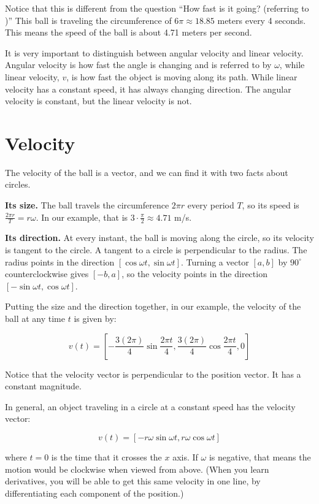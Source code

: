 Notice that this is different from the question ``How fast is it
going? (referring to )''  This ball is traveling the circumference of $6\pi \approx
  18.85$ meters every 4 seconds. This means the speed of the ball is about
4.71 meters per second.

It is very important to distinguish between angular velocity and linear velocity. Angular velocity is how fast the angle is changing and is referred to by $\omega$, while linear velocity, $v$, is how fast the object is moving along its path. While linear velocity has a constant speed, it has always changing direction. The angular velocity is constant, but the linear velocity is not.

\section{Velocity}
The velocity of the ball is a vector, and we can find it with two facts about circles.

\textbf{Its size.} The ball travels the circumference $2\pi r$ every period $T$, so its speed is
$\frac{2\pi r}{T} = r\omega$. In our example, that is $3 \cdot \frac{\pi}{2} \approx 4.71$ m/s.

\textbf{Its direction.} At every instant, the ball is moving along the circle, so its velocity is tangent to the
circle. A tangent to a circle is perpendicular to the radius. The radius points in the direction
$[\cos \omega t, \sin \omega t]$. Turning a vector $[a, b]$ by $90^\circ$ counterclockwise gives $[-b, a]$, so
the velocity points in the direction $[-\sin \omega t, \cos \omega t]$.

Putting the size and the direction together, in our example, the velocity of the ball at any time $t$ is given by:

$$v(t) = \left[ -\frac{3 (2\pi)}{4} \sin{\frac{2\pi t}{4}}, \frac{3(2\pi)}{4} \cos{\frac{2\pi t}{4}}, 0 \right]$$

Notice that the velocity vector is perpendicular to the position vector. It has a constant magnitude.

In general, an object traveling in a circle at a constant speed has the velocity vector:

$$v(t) = \left[ -r\omega \sin{\omega t}, r\omega \cos{\omega t}\right]$$

where $t = 0$ is the time that it crosses the $x$ axis. If $\omega$ is
negative, that means the motion would be clockwise when viewed from
above. (When you learn derivatives, you will be able to get this same velocity in one line, by
differentiating each component of the position.)

